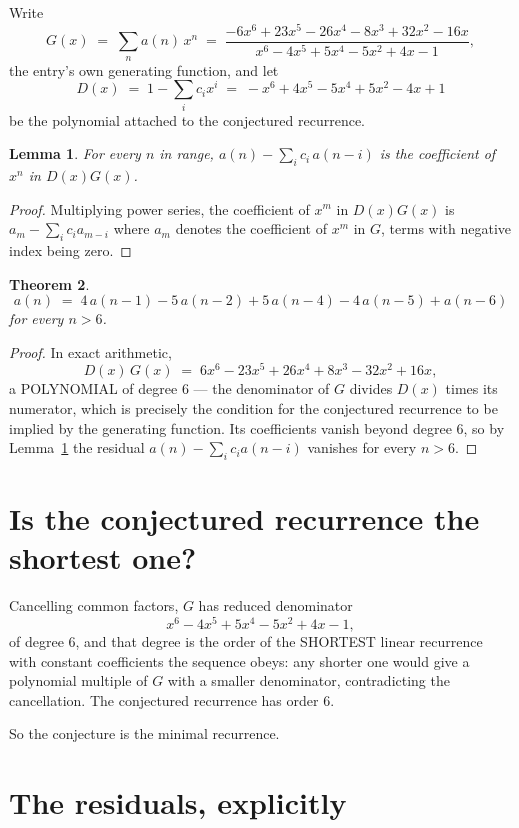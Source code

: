 \documentclass[11pt,a4paper]{article}
\theoremstyle{plain}
\newtheorem{theorem}{Theorem}
\newtheorem{lemma}[theorem]{Lemma}
\theoremstyle{definition}
\begin{document}
Write
\[
G(x)\;=\;\sum_{n}a(n)\,x^{n}\;=\;\frac{- 6 x^{6} + 23 x^{5} - 26 x^{4} - 8 x^{3} + 32 x^{2} - 16 x}{x^{6} - 4 x^{5} + 5 x^{4} - 5 x^{2} + 4 x - 1},
\]
the entry's own generating function, and let
\[
D(x)\;=\;1-\sum_i c_i x^{i}\;=\;- x^{6} + 4 x^{5} - 5 x^{4} + 5 x^{2} - 4 x + 1
\]
be the polynomial attached to the conjectured recurrence.

\begin{lemma}\label{lem:key}
For every $n$ in range, $a(n)-\sum_i c_i\,a(n-i)$ is the coefficient of $x^{n}$ in
$D(x)G(x)$.
\end{lemma}

\begin{proof}
Multiplying power series, the coefficient of $x^{m}$ in $D(x)G(x)$ is
$a_m-\sum_i c_i a_{m-i}$ where $a_m$ denotes the coefficient of $x^{m}$ in $G$, terms with
negative index being zero.
\end{proof}

\begin{theorem}
\[
a(n)\;=\;4\,a(n-1) - 5\,a(n-2) + 5\,a(n-4) - 4\,a(n-5) + a(n-6)
\]
for every $n>6$.
\end{theorem}

\begin{proof}
In exact arithmetic,
\[
D(x)\,G(x)\;=\;6 x^{6} - 23 x^{5} + 26 x^{4} + 8 x^{3} - 32 x^{2} + 16 x,
\]
a POLYNOMIAL of degree $6$ --- the denominator of $G$ divides $D(x)$ times its numerator,
which is precisely the condition for the conjectured recurrence to be implied by the
generating function. Its coefficients vanish beyond degree $6$, so by
Lemma~\ref{lem:key} the residual $a(n)-\sum_ic_ia(n-i)$ vanishes for every
$n>6$.
\end{proof}

\section{Is the conjectured recurrence the shortest one?}

Cancelling common factors, $G$ has reduced denominator
\[
x^{6} - 4 x^{5} + 5 x^{4} - 5 x^{2} + 4 x - 1,
\]
of degree $6$, and that degree is the order of the SHORTEST linear recurrence with
constant coefficients the sequence obeys: any shorter one would give a polynomial multiple of
$G$ with a smaller denominator, contradicting the cancellation. The conjectured recurrence has
order $6$.

So the conjecture is the minimal recurrence.

\section{The residuals, explicitly}
\end{document}
